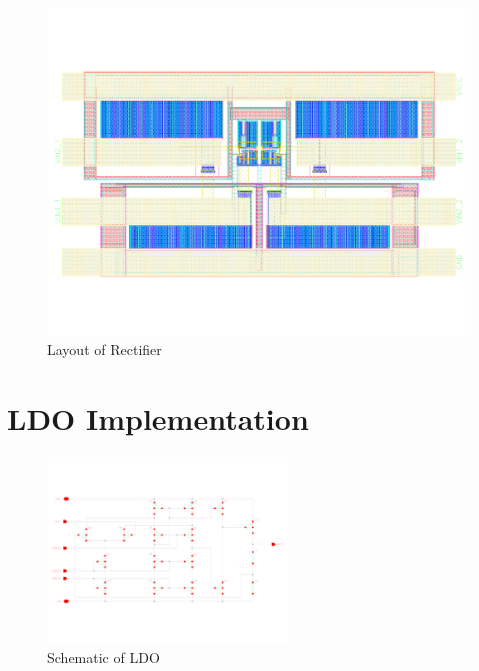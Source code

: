 \documentclass[UKenglish]{ifimaster}  %
\begin{document}
\begin{appendices}
\begin{figure} [!htbp] %
 	\centering
  	\includegraphics[width=\textwidth]{appendix/layout_rectifier_l.pdf} 
 	\caption{Layout of Rectifier} 
	\label{fig:appen_layout_rectifer} 
\end{figure}


\chapter{LDO Implementation}

\begin{figure} [!htbp]	%
 	\centering
  	\includegraphics[angle=90, width=0.57\textwidth]{appendix/schematic_ldo_l.pdf} 
 	\caption{Schematic of LDO} 
	\label{fig:appen_schematic_ldo} 
\end{figure}


\end{appendices}
\end{document}
